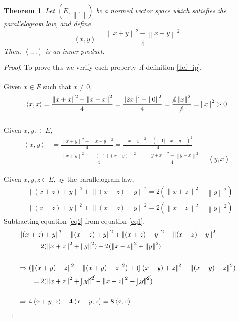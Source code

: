 \documentclass{article}
\newtheorem{theorem}{Theorem}
\newcommand{\norm}[1]{\left\|#1\right\|}
\newcommand{\ip}[2]{\left\langle #1, #2\right\rangle}
\begin{document}
\begin{theorem}
  Let \((E,\norm{.})\) be a normed vector space which satisfies the
  parallelogram law, and define
  \[\ip{x}{y} = \frac{\norm{x+y}^2 - \norm{x-y}^2}{4}\]
  Then, \(\ip{.}{.}\) is an inner product.
\end{theorem}

\begin{proof}
  To prove this we verify each property of definition \ref{def_ip}.\\
  \\
   Given \(x \in E\) such that \(x \neq 0\),
  \begin{align*}
    \ip{x}{x}
    = \frac{\norm{x + x}^2 - \norm{x - x}^2}{4}
    = \frac{\norm{2x}^2 - \norm{0}^2}{4}
    = \frac{\cancel{4}\norm{x}^2}{\cancel{4}}
    = \norm{x}^2 > 0
  \end{align*}
  \\
   Given \(x, y, \in E\),
  \begin{align*}
    \ip{x}{y}
    &= \frac{\norm{x + y}^2 - \norm{x - y}^2}{4}
    = \frac{\norm{x + y}^2 - (|-1|\norm{x - y})^2}{4}\\
    &= \frac{\norm{x + y}^2 - \norm{(-1)(x - y)}^2}{4}
    = \frac{\norm{y + x}^2 - \norm{y - x}^2}{4}
    = \ip{y}{x}
  \end{align*}
  \\
   Given \(x, y, z \in E\), by the parallelogram law,
  \begin{align}
    & \norm{(x+z)+y}^2+\norm{(x+z)-y}^2=2(\norm{x+z}^2+\norm{y}^2)\label{eq1} \\
    & \norm{(x-z)+y}^2+\norm{(x-z)-y}^2=2(\norm{x-z}^2+\norm{y}^2)\label{eq2}
  \end{align}
  Subtracting equation \ref{eq2} from equation \ref{eq1},
  \begin{align}
    &\norm{(x+z)+y}^2 - \norm{(x-z)+y}^2 +\norm{(x+z)-y}^2 -
      \norm{(x-z)-y}^2 \nonumber\\
    &\qquad = 2(\norm{x+z}^2+\norm{y}^2) - 2(\norm{x-z}^2+\norm{y}^2) \nonumber\\
    \nonumber \\
    &\Rightarrow(\norm{(x+y)+z}^2 - \norm{(x+y)-z}^2) + (\norm{(x-y)+z}^2 -
    \norm{(x-y)-z}^2) \nonumber\\
    &\qquad = 2(\norm{x+z}^2 + \cancel{\norm{y}^2} - \norm{x-z}^2 -
    \cancel{\norm{y}^2}) \nonumber\\
    \nonumber\\
    &\Rightarrow 4\ip{x+y}{z} + 4\ip{x-y}{z} = 8\ip{x}{z} \nonumber\\

\end{align}
\end{proof}
\end{document}

